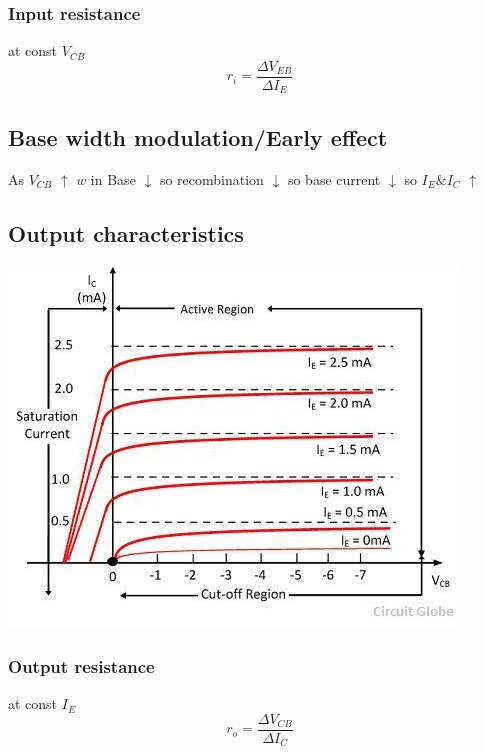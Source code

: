 \documentclass[10pt, a4paper]{report}
\begin{document}
	\subsubsection{Input resistance}
	at const $ V_{CB} $
	$$r_i = \dfrac{\Delta V_{EB}}{\Delta I_E} $$
	\subsection{Base width modulation/Early effect}
	As $ V_{CB} $ $\uparrow$ $ w $ in Base $\downarrow$ so recombination $\downarrow$ so base current $\downarrow$ so $ I_E \& I_C $ $\uparrow$
	\subsection{Output characteristics}
	\includegraphics[width=0.6\linewidth]{img/oputputcharacteristicscbconfiguration}
	\subsubsection{Output resistance}
	at const $ I_E $
	$$r_o = \dfrac{\Delta V_{CB}}{\Delta I_C} $$
\end{document}
